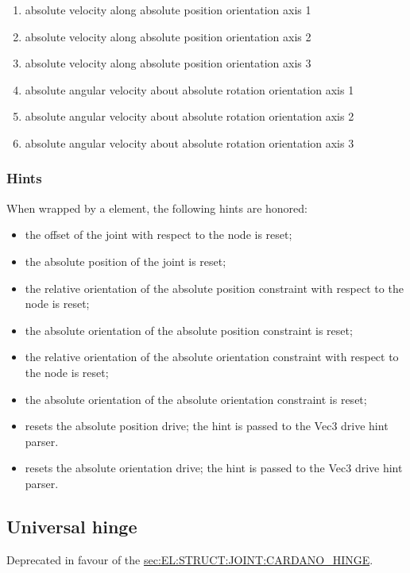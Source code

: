 \begin{enumerate}
\item {} absolute velocity along absolute position orientation axis 1
\item {} absolute velocity along absolute position orientation axis 2
\item {} absolute velocity along absolute position orientation axis 3

\item {} absolute angular velocity about absolute rotation orientation axis 1
\item {} absolute angular velocity about absolute rotation orientation axis 2
\item {} absolute angular velocity about absolute rotation orientation axis 3
\end{enumerate}

\subsubsection{Hints}
When wrapped by a  element, the following hints are honored:
\begin{itemize}
\item {} the offset of the joint
with respect to the node is reset;
\item {} the absolute position of the joint
is reset;
\item {} the relative orientation
of the absolute position constraint with respect to the node is reset;
\item {} the absolute orientation 
of the absolute position constraint is reset;
\item {} the relative orientation
of the absolute orientation constraint with respect to the node is reset;
\item {} the absolute orientation 
of the absolute orientation constraint is reset;
\item {} resets the absolute position drive;
the hint is passed to the Vec3 drive hint parser.
\item {} resets the absolute orientation drive;
the hint is passed to the Vec3 drive hint parser.
\end{itemize}




\subsection{Universal hinge}
\label{sec:EL:STRUCT:JOINT:UNIVERSAL_HINGE}
Deprecated in favour of the
\hyperref{\kw{cardano hinge}}{\kw{cardano hinge} (see Section~}{)}{sec:EL:STRUCT:JOINT:CARDANO_HINGE}.



